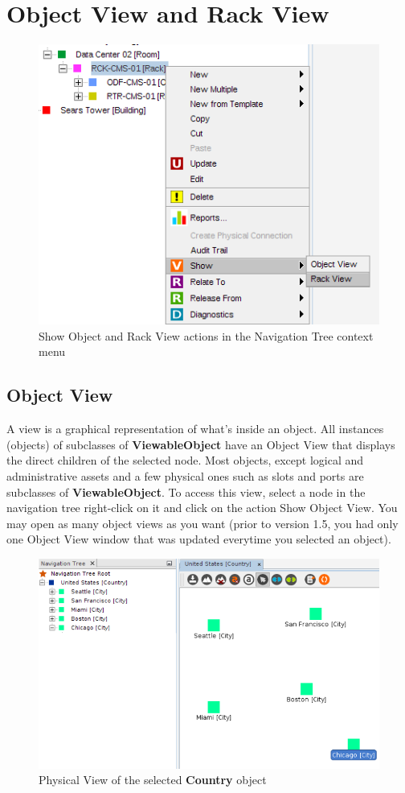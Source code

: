 \documentclass[a4paper]{article}
\begin{document}
	\clearpage
	\section{Object View and Rack View} \label{sec:object_view_and_rack_view}
	\begin{figure}[h!]
		\centering
		\includegraphics[width=0.6\linewidth]{img/actions_object_and_rack_views.png}
		\caption{Show Object and Rack View actions in the Navigation Tree context menu}
		\label{fig:actions_object_and_rack_views}
	\end{figure}
	\subsection{Object View} \label{sec:default_view}
		A view is a graphical representation of what's inside an object. All instances (objects) of subclasses of \textbf{ViewableObject} have an Object View that displays the direct children of the selected node. Most objects, except logical and administrative assets and a few physical ones such as slots and ports are subclasses of \textbf{ViewableObject}. To access this view, select a node in the navigation tree right-click on it and click on the action Show Object View. You may open as many object views as you want (prior to version 1.5, you had only one Object View window that was updated everytime you selected an object).
		\begin{figure}[h!]
			\centering
			\includegraphics[width=0.9\linewidth]{img/default_view.png}
			\caption{Physical View of the selected \textbf{Country} object}
			\label{fig:default_view}
		\end{figure}
		
\end{document}
